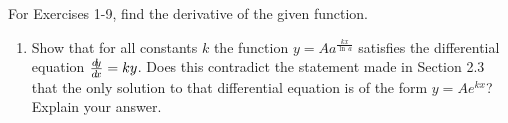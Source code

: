 \divider
\vspace{3mm}
\startexercises\label{sec2dot4}
{\small
{}
\par\noindent For Exercises 1-9, find the derivative of the given function.
\begin{enumerate}[item-label={\bfseries \arabic*.}]
[item-label={{[\bfseries \arabic*.]}}]
 \item Show that for all constants $k$ the function $y = A a^{\frac{kx}{\ln\,a}}$
  satisfies the differential equation $\frac{d\negmedspace y}{d\!x} = ky$. Does this contradict the
  statement made in Section 2.3 that the only solution to that differential
  equation is of the form $y = A e^{kx}$? Explain your answer.
\end{enumerate}}
